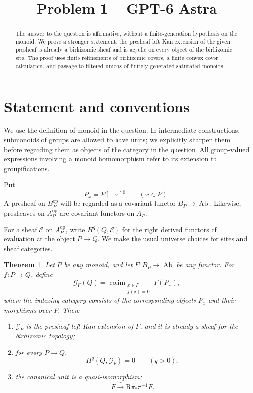 \documentclass[11pt]{article}
\title{Problem 1 -- GPT-6 Astra}
\author{}
\date{}
\newtheorem{theorem}{Theorem}[section]
\theoremstyle{definition}
\theoremstyle{remark}
\DeclareMathOperator{\colim}{colim}
\DeclareMathOperator{\Ab}{Ab}
\newcommand{\cG}{\mathcal G}
\begin{document}
\maketitle

\begin{abstract}
The answer to the question is affirmative, without a finite-generation
hypothesis on the monoid. We prove a stronger statement: the presheaf
left Kan extension of the given presheaf is already a birhizomic sheaf
and is acyclic on every object of the birhizomic site. The proof uses
finite refinements of birhizomic covers, a finite convex-cover
calculation, and passage to filtered unions of finitely generated
saturated monoids.
\end{abstract}

\section{Statement and conventions}

We use the definition of monoid in the question. In intermediate
constructions, submonoids of groups are allowed to have units; we
explicitly sharpen them before regarding them as objects of the
category in the question. All group-valued expressions involving a
monoid homomorphism refer to its extension to groupifications.

Put
\[
P_x=P[-x]^\sharp\qquad(x\in P).
\]
A presheaf on \(B_P^{\mathrm{op}}\) will be regarded as a covariant
functor \(B_P\to\Ab\). Likewise, presheaves on \(A_P^{\mathrm{op}}\)
are covariant functors on \(A_P\).

For a sheaf \(\mathcal E\) on \(A_P^{\mathrm{op}}\), write
\(H^q(Q,\mathcal E)\) for the right derived functors of evaluation at
the object \(P\to Q\). We make the usual universe choices for sites
and sheaf categories.

\begin{theorem}\label{thm:main}
Let \(P\) be any monoid, and let \(F:B_P\to\Ab\) be any functor.
For \(f:P\to Q\), define
\begin{equation}\label{eq:main-formula}
\cG_F(Q)=
\colim_{\substack{x\in P\\f(x)=0}} F(P_x),
\end{equation}
where the indexing category consists of the corresponding objects
\(P_x\) and their morphisms over \(P\). Then:
\begin{enumerate}[label=\textup{(\roman*)}]
\item \(\cG_F\) is the presheaf left Kan extension of \(F\), and it is
already a sheaf for the birhizomic topology;
\item for every \(P\to Q\),
\[
H^q(Q,\cG_F)=0\qquad(q>0);
\]
\item the canonical unit is a quasi-isomorphism:
\[
F \xrightarrow{\ \sim\ } \mathrm R\pi_*\pi^{-1}F.
\]
\end{enumerate}
\end{theorem}
\end{document}
